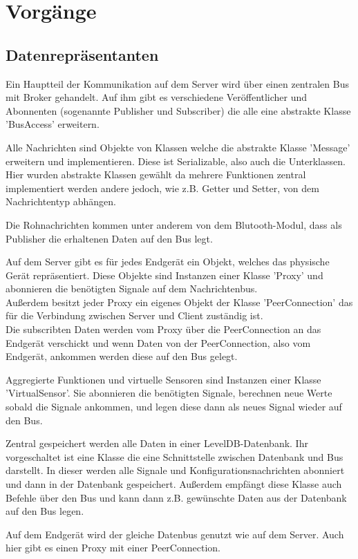 \documentclass[entwurf.tex]{subfiles}
\begin{document}
\chapter{Vorgänge}
\section{Datenrepräsentanten}
Ein Hauptteil der Kommunikation auf dem Server wird über einen zentralen Bus mit Broker gehandelt. Auf ihm gibt es verschiedene Veröffentlicher und Abonnenten (sogenannte Publisher und Subscriber) die alle  eine abstrakte Klasse 'BusAccess' erweitern.

Alle Nachrichten sind Objekte von Klassen welche die abstrakte Klasse 'Message' erweitern und implementieren. Diese ist Serializable, also auch die Unterklassen. Hier wurden abstrakte Klassen gewählt da mehrere Funktionen zentral implementiert werden andere jedoch, wie z.B. Getter und Setter, von dem Nachrichtentyp abhängen.  

Die Rohnachrichten kommen unter anderem von dem Blutooth-Modul, dass als Publisher die erhaltenen Daten auf den Bus legt.

Auf dem Server gibt es für jedes Endgerät ein Objekt, welches das physische Gerät repräsentiert. Diese Objekte sind Instanzen einer Klasse 'Proxy' und abonnieren die benötigten Signale auf dem Nachrichtenbus. \\
Außerdem besitzt jeder Proxy ein eigenes Objekt der Klasse 'PeerConnection' das für die Verbindung zwischen Server und Client zuständig ist. \\
Die subscribten Daten werden vom Proxy über die PeerConnection an das Endgerät verschickt und wenn Daten von der PeerConnection, also vom Endgerät, ankommen werden diese auf den Bus gelegt.

Aggregierte Funktionen und virtuelle Sensoren sind Instanzen einer Klasse 'VirtualSensor'. Sie abonnieren die benötigten Signale, berechnen neue Werte sobald die Signale ankommen, und legen diese dann als neues Signal wieder auf den Bus. 

Zentral gespeichert werden alle Daten in einer LevelDB-Datenbank. Ihr vorgeschaltet ist eine Klasse die eine Schnittstelle zwischen Datenbank und Bus darstellt. In dieser werden alle Signale und Konfigurationsnachrichten abonniert und dann in der Datenbank gespeichert. Außerdem empfängt diese Klasse auch Befehle über den Bus und kann dann z.B. gewünschte Daten aus der Datenbank auf den Bus legen.

Auf dem Endgerät wird der gleiche Datenbus genutzt wie auf dem Server. Auch hier gibt es einen Proxy mit einer PeerConnection.
\end{document}
